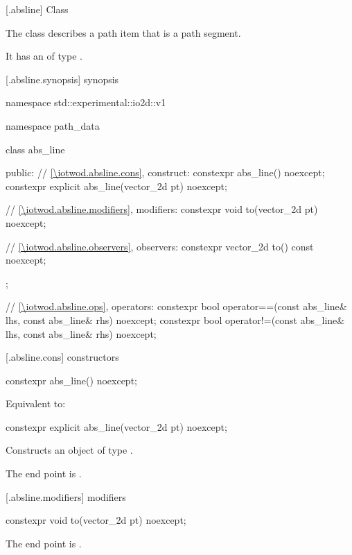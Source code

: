  [\iotwod.absline] {Class }

\pnum
{}%
The class  describes a path item that is a path segment.

\pnum
It has an  of type .

 [\iotwod.absline.synopsis] { synopsis}

\begin{codeblock}
namespace std::experimental::io2d::v1 {
  namespace path_data {
    class abs_line {
    public:
      // \ref{\iotwod.absline.cons}, construct:
      constexpr abs_line() noexcept;
      constexpr explicit abs_line(vector_2d pt) noexcept;

      // \ref{\iotwod.absline.modifiers}, modifiers:
      constexpr void to(vector_2d pt) noexcept;

      // \ref{\iotwod.absline.observers}, observers:
      constexpr vector_2d to() const noexcept;
    };
    
    // \ref{\iotwod.absline.ops}, operators:
    constexpr bool operator==(const abs_line& lhs, const abs_line& rhs) 
      noexcept;
    constexpr bool operator!=(const abs_line& lhs, const abs_line& rhs) 
      noexcept;
  }
}
\end{codeblock}

 [\iotwod.absline.cons] { constructors}

%
\begin{itemdecl}
constexpr abs_line() noexcept;
\end{itemdecl}
\begin{itemdescr}
\pnum
\effects
Equivalent to: 
\end{itemdescr}

%
\begin{itemdecl}
constexpr explicit abs_line(vector_2d pt) noexcept;
\end{itemdecl}
\begin{itemdescr}
\pnum
\effects
Constructs an object of type .

\pnum
The end point is .
\end{itemdescr}

 [\iotwod.absline.modifiers]{ modifiers}

%
\begin{itemdecl}
constexpr void to(vector_2d pt) noexcept;
\end{itemdecl}
\begin{itemdescr}
\pnum
\effects
The end point is .
\end{itemdescr}

